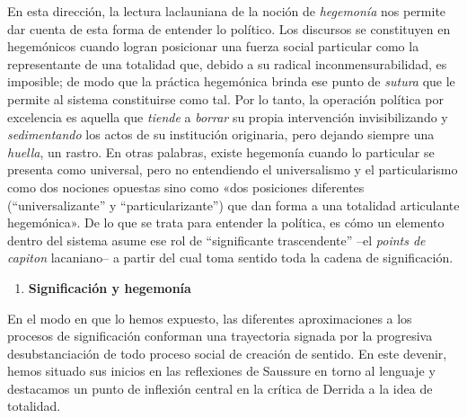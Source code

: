 En esta dirección, la lectura laclauniana de la noción de \emph{hegemonía} nos permite dar cuenta de esta forma de entender lo político. Los discursos se constituyen en hegemónicos cuando logran posicionar una fuerza social particular como la representante de una totalidad que, debido a su radical inconmensurabilidad, es imposible; de modo que la práctica hegemónica brinda ese punto de \emph{sutura }que le permite al sistema constituirse como tal. Por lo tanto, la operación política por excelencia es aquella que \emph{tiende} a \emph{borrar} su propia intervención invisibilizando y \emph{sedimentando} los actos de su institución originaria, pero dejando siempre una \emph{huella}, un rastro. En otras palabras, existe hegemonía cuando lo particular se presenta como universal, pero no entendiendo el universalismo y el particularismo como dos nociones opuestas sino como «dos posiciones diferentes (``universalizante'' y ``particularizante'') que dan forma a una totalidad articulante hegemónica». De lo que se trata para entender la política, es cómo un elemento dentro del sistema asume ese rol de ``significante trascendente'' --el \emph{points de capiton} lacaniano-- a partir del cual toma sentido toda la cadena de significación.

\begin{enumerate}
\def\labelenumi{\arabic{enumi}.}
\item
  \textbf{Significación y hegemonía}
\end{enumerate}

En el modo en que lo hemos expuesto, las diferentes aproximaciones a los procesos de significación conforman una trayectoria signada por la progresiva desubstanciación de todo proceso social de creación de sentido. En este devenir, hemos situado sus inicios en las reflexiones de Saussure en torno al lenguaje y destacamos un punto de inflexión central en la crítica de Derrida a la idea de totalidad.

